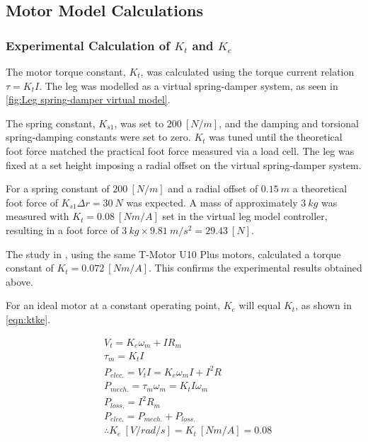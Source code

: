 \subsection{Motor Model Calculations}
\label{sec:Motor Model Calculations}

\subsubsection{Experimental Calculation of $K_t$ and $K_e$}
\label{sec:Experimental Calculation of Kt}

The motor torque constant, $K_t$, was calculated using the torque current relation $\tau = K_tI$. The leg was modelled as a virtual spring-damper system, as seen in \cref{fig:Leg spring-damper virtual model}. 

The spring constant, $K_{s1}$, was set to $200\ [N/m]$, and the damping and torsional spring-damping constants were set to zero. $K_t$ was tuned until the theoretical foot force matched the practical foot force measured via a load cell. The leg was fixed at a set height imposing a radial offset on the virtual spring-damper system.

For a spring constant of $200\ [N/m]$ and a radial offset of $0.15\ m$ a theoretical foot force of $K_{s1}\Delta r = 30\ N$ was expected. A mass of approximately $3\ kg$ was measured with $K_t = 0.08\ [Nm/A]$ set in the virtual leg model controller, resulting in a foot force of $3\ kg \times 9.81\ m/s^2 = 29.43\ [N]$. 

The study in \cite{Kalouche2016}, using the same T-Motor U10 Plus motors, calculated a torque constant of $K_t =  0.072\ [Nm/A]$. This confirms the experimental results obtained above.

For an ideal motor at a constant operating point, $K_e$ will equal $K_t$, as shown in \cref{eqn:ktke}.

\begin{equation} \label{eqn:ktke}
\begin{aligned}
&V_t = K_e\omega_m + IR_m \\
&\tau_m = K_t I \\
&P_{elec.} = V_t I = K_e \omega_m I + I^2 R \\ 
&P_{mech.} = \tau_m \omega_m = K_t I \omega_m \\
&P_{loss.} = I^2 R_m \\
&P_{elec.} = P_{mech.} + P_{loss.} \\
&\therefore K_e\ [V/rad/s]= K_t\ [Nm/A] = 0.08
\end{aligned} 
\end{equation}

